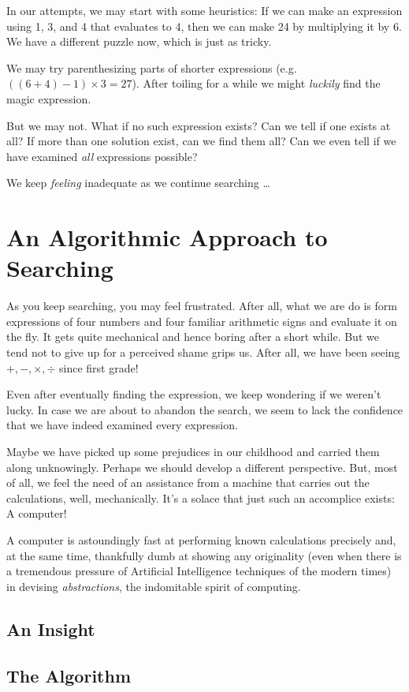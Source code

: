 \documentclass[english,smartquotes]{hgbarticle}
\begin{document}
In our attempts, we may start with some heuristics: If we can make an expression using 1, 3, and 4 that evaluates to 4, then we can make 24 by multiplying it by 6. We have a different puzzle now, which is just as tricky.

We may try parenthesizing parts of shorter expressions (e.g. $((6+4)-1)\times3 = 27$). After toiling for a while we might \textit{luckily} find the magic expression.

But we may not. What if no such expression exists? Can we tell if one exists at all? If more than one solution exist, can we find them all? Can we even tell if we have examined \textit{all} expressions possible?

We keep \textit{feeling} inadequate as we continue searching \dots
\section{An Algorithmic Approach to Searching}
As you keep searching, you may feel frustrated. After all, what we are do is form expressions of four numbers and four familiar arithmetic signs and evaluate it on the fly. It gets quite mechanical and hence boring after a short while. But we tend not to give up for a perceived shame grips us. After all, we have been seeing $+, -, \times, \div$ since first grade!

Even after eventually finding the expression, we keep wondering if we weren't lucky. In case we are about to abandon the search, we seem to lack the confidence that we have indeed examined every expression. 

Maybe we have picked up some prejudices in our childhood and carried them along unknowingly. Perhaps we should develop a different perspective. But, most of all, we feel the need of an assistance from a machine that carries out the calculations, well, mechanically. It's a solace that just such an accomplice exists: A computer! 

A computer is astoundingly fast at performing known calculations precisely and, at the same time, thankfully dumb at showing any originality (even when there is a tremendous pressure of Artificial Intelligence techniques of the modern times) in devising \textit{abstractions}, the indomitable spirit of computing.

\subsection{An Insight}
\subsection{The Algorithm}
\end{document}
